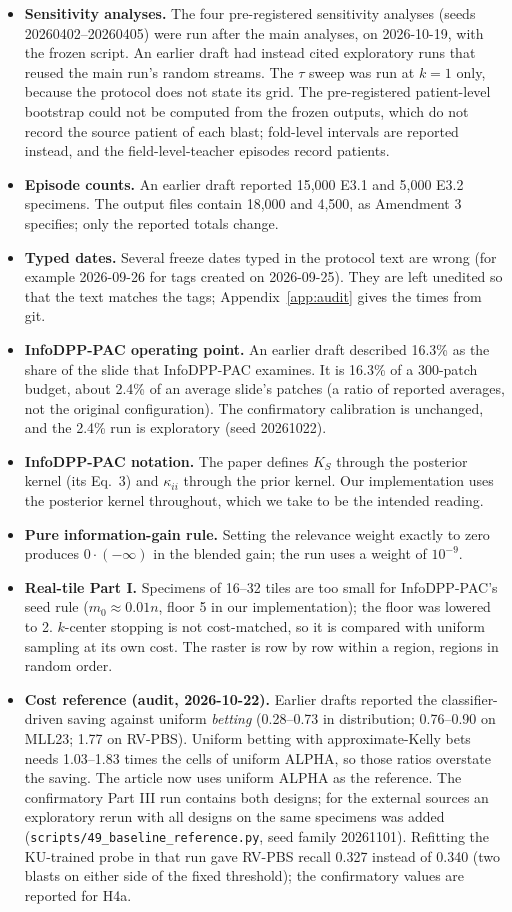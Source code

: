 \documentclass[11pt]{article}
\theoremstyle{remark}
\theoremstyle{definition}
\begin{document}
\begin{itemize}
\item \textbf{Sensitivity analyses.} The four pre-registered sensitivity analyses (seeds 20260402--20260405) were run after the main analyses, on 2026-10-19, with the frozen script. An earlier draft had instead cited exploratory runs that reused the main run's random streams. The $\tau$ sweep was run at $k=1$ only, because the protocol does not state its grid. The pre-registered patient-level bootstrap could not be computed from the frozen outputs, which do not record the source patient of each blast; fold-level intervals are reported instead, and the field-level-teacher episodes record patients.
\item \textbf{Episode counts.} An earlier draft reported 15,000 E3.1 and 5,000 E3.2 specimens. The output files contain 18,000 and 4,500, as Amendment 3 specifies; only the reported totals change.
\item \textbf{Typed dates.} Several freeze dates typed in the protocol text are wrong (for example 2026-09-26 for tags created on 2026-09-25). They are left unedited so that the text matches the tags; Appendix~\ref{app:audit} gives the times from git.
\item \textbf{InfoDPP-PAC operating point.} An earlier draft described 16.3\% as the share of the slide that InfoDPP-PAC examines. It is 16.3\% of a 300-patch budget, about 2.4\% of an average slide's patches (a ratio of reported averages, not the original configuration). The confirmatory calibration is unchanged, and the 2.4\% run is exploratory (seed 20261022).
\item \textbf{InfoDPP-PAC notation.} The paper defines $K_S$ through the posterior kernel (its Eq.~3) and $\kappa_{ii}$ through the prior kernel. Our implementation uses the posterior kernel throughout, which we take to be the intended reading.
\item \textbf{Pure information-gain rule.} Setting the relevance weight exactly to zero produces $0\cdot(-\infty)$ in the blended gain; the run uses a weight of $10^{-9}$.
\item \textbf{Real-tile Part I.} Specimens of 16--32 tiles are too small for InfoDPP-PAC's seed rule ($m_0\approx0.01n$, floor 5 in our implementation); the floor was lowered to 2. $k$-center stopping is not cost-matched, so it is compared with uniform sampling at its own cost. The raster is row by row within a region, regions in random order.
\item \textbf{Cost reference (audit, 2026-10-22).} Earlier drafts reported the classifier-driven saving against uniform \emph{betting} (0.28--0.73 in distribution; 0.76--0.90 on MLL23; 1.77 on RV-PBS). Uniform betting with approximate-Kelly bets needs 1.03--1.83 times the cells of uniform ALPHA, so those ratios overstate the saving. The article now uses uniform ALPHA as the reference. The confirmatory Part III run contains both designs; for the external sources an exploratory rerun with all designs on the same specimens was added (\texttt{scripts/49\_baseline\_reference.py}, seed family 20261101). Refitting the KU-trained probe in that run gave RV-PBS recall 0.327 instead of 0.340 (two blasts on either side of the fixed threshold); the confirmatory values are reported for H4a.

\end{itemize}
\end{document}
